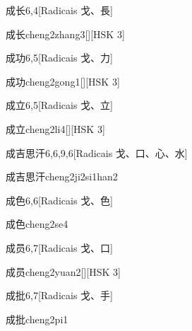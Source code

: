 \begin{entry}{成长}{6,4}[Radicais ⼽、⾧]
  \begin{phonetics}{成长}{cheng2zhang3}[][HSK 3]
  \end{phonetics}
\end{entry}

\begin{entry}{成功}{6,5}[Radicais ⼽、⼒]
  \begin{phonetics}{成功}{cheng2gong1}[][HSK 3]
  \end{phonetics}
\end{entry}

\begin{entry}{成立}{6,5}[Radicais ⼽、⽴]
  \begin{phonetics}{成立}{cheng2li4}[][HSK 3]
  \end{phonetics}
\end{entry}

\begin{entry}{成吉思汗}{6,6,9,6}[Radicais ⼽、⼝、⼼、⽔]
  \begin{phonetics}{成吉思汗}{cheng2ji2si1han2}
  \end{phonetics}
\end{entry}

\begin{entry}{成色}{6,6}[Radicais ⼽、⾊]
  \begin{phonetics}{成色}{cheng2se4}
  \end{phonetics}
\end{entry}

\begin{entry}{成员}{6,7}[Radicais ⼽、⼝]
  \begin{phonetics}{成员}{cheng2yuan2}[][HSK 3]
  \end{phonetics}
\end{entry}

\begin{entry}{成批}{6,7}[Radicais ⼽、⼿]
  \begin{phonetics}{成批}{cheng2pi1}
  \end{phonetics}
\end{entry}


